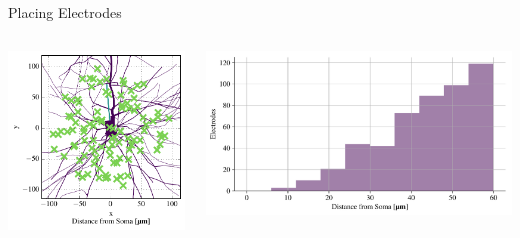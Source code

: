 \documentclass[aspectratio=169]{beamer}
\begin{document}
\begin{frame}{Placing Electrodes}
    \begin{columns}
        \begin{column}{0.28\textwidth}
            \begin{center}
                \includegraphics[width=\textwidth]{images/sphere_morph_elec_xy.pdf}
            \end{center}
        \end{column}
        \begin{column}{0.68\textwidth}
            \begin{center}
                \includegraphics[width=\textwidth]{images/sphere_r_hist.pdf}
            \end{center}
        \end{column}
    \end{columns}
\end{frame}
\end{document}
